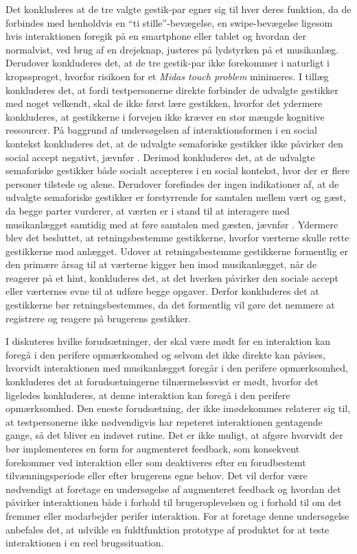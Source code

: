 Det konkluderes at de tre valgte gestik-par egner sig til hver deres funktion, da de forbindes med henholdvis en \enquote{ti stille}-bevægelse, en swipe-bevægelse ligesom hvis interaktionen foregik på en smartphone eller tablet og hvordan der normalvist, ved brug af en drejeknap, justeres på lydstyrken på et musikanlæg. Derudover konkluderes det, at de tre gestik-par ikke forekommer i naturligt i kropssproget, hvorfor risikoen for et \textit{Midas touch problem} minimeres. I tillæg konkluderes det, at fordi testpersonerne direkte forbinder de udvalgte gestikker med noget velkendt, skal de ikke først lære gestikken, hvorfor det ydermere konkluderes, at gestikkerne i forvejen ikke kræver en stor mængde kognitive ressourcer.\blankline 
%
På baggrund af undersøgelsen af interaktionsformen i en social kontekst konkluderes det, at de udvalgte semaforiske gestikker ikke påvirker den social accept negativt, jævnfør . Derimod konkluderes det, at de udvalgte semaforiske gestikker både socialt accepteres i en social kontekst, hvor der er flere personer tilstede og alene. Derudover forefindes der ingen indikationer af, at de udvalgte semaforiske gestikker er forstyrrende for samtalen mellem vært og gæst, da begge parter vurderer, at værten er i stand til at interagere med musikanlægget samtidig med at føre samtalen med gæsten, jævnfør . Ydermere blev det besluttet, at retningsbestemme gestikkerne, hvorfor værterne skulle rette gestikkerne mod anlægget. Udover at retningsbestemme gestikkerne formentlig er den primære årsag til at værterne kigger hen imod musikanlægget, når de reagerer på et hint, konkluderes det, at det hverken påvirker den sociale accept eller værternes evne til at udføre begge opgaver. Derfor konkluderes det at gestikkerne bør retningsbestemmes, da det formentlig vil gøre det nemmere at registrere og reagere på brugerens gestikker.  

I  diskuteres hvilke forudsætninger, der skal være mødt før en interaktion kan foregå i den perifere opmærksomhed og selvom det ikke direkte kan påvises, hvorvidt interaktionen med musikanlægget foregår i den perifere opmærksomhed, konkluderes det at forudsætningerne tilnærmelsesvist er mødt, hvorfor det ligeledes konkluderes, at denne interaktion kan foregå i den perifere opmærksomhed. Den eneste forudsætning, der ikke imødekommes relaterer sig til, at testpersonerne ikke nødvendigvis har repeteret interaktionen gentagende gange, så det bliver en indøvet rutine.\blankline
%
Det er ikke muligt, at afgøre hvorvidt der bør implementeres en form for augmenteret feedback, som konsekvent forekommer ved interaktion eller som deaktiveres efter en forudbestemt tilvænningsperiode eller efter brugerens egne behov. Det vil derfor være nødvendigt at foretage en undersøgelse af augmenteret feedback og hvordan det påvirker interaktionen både i forhold til brugeroplevelsen og i forhold til om det fremmer eller modarbejder perifer interaktion. For at foretage denne undersøgelse anbefales det, at udvikle en fuldtfunktion prototype af produktet for at teste interaktionen i en reel brugssituation.




